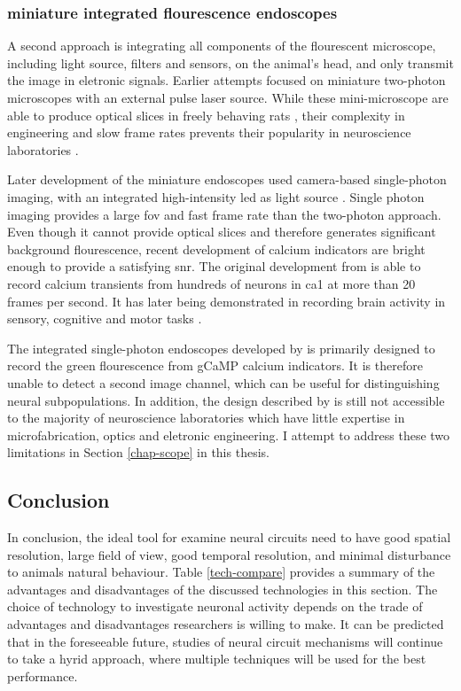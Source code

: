 \subsubsection{miniature integrated flourescence endoscopes}
A second approach is integrating all components of the flourescent microscope, including light source, filters and sensors, on the animal's head, and only transmit the image in eletronic signals. Earlier attempts focused on miniature two-photon microscopes with an external pulse laser source\citep{flusberg05, piyawattanametha09}. While these mini-microscope are able to produce optical slices in freely behaving rats \citep{sawinski09}, their complexity in engineering and slow frame rates prevents their popularity in neuroscience laboratories \citep{hamel15, yang17}.

Later development of the miniature endoscopes used camera-based single-photon imaging, with an integrated high-intensity \gls{led} as light source \citep{ghosh11}. Single photon imaging provides a large \gls{fov} and fast frame rate than the two-photon approach. Even though it cannot provide optical slices and therefore generates significant background flourescence, recent development of calcium indicators are bright enough to provide a satisfying \gls{snr}. The original development from \citet{ghosh11} is able to record calcium transients from hundreds of neurons in \gls{ca1} at more than 20 frames per second. It has later being demonstrated in recording brain activity in sensory, cognitive and motor tasks \citep{ziv13}.

The integrated single-photon endoscopes developed by \citet{ghosh11} is primarily designed to record the green flourescence from gCaMP calcium indicators. It is therefore unable to detect a second image channel, which can be useful for distinguishing neural subpopulations. In addition, the design described by \citet{ghosh11} is still not accessible to the majority of neuroscience laboratories which have little expertise in microfabrication, optics and eletronic engineering. I attempt to address these two limitations in Section \ref{chap-scope} in this thesis. 

\subsection{Conclusion}

In conclusion, the ideal tool for examine neural circuits need to have good spatial resolution, large field of view, good temporal resolution, and minimal disturbance to animals natural behaviour. Table \ref{tech-compare} provides a summary of the advantages and disadvantages of the discussed technologies in this section. The choice of technology to investigate neuronal activity depends on the trade of advantages and disadvantages researchers is willing to make. It can be predicted that in the foreseeable future, studies of neural circuit mechanisms will continue to take a hyrid approach, where multiple techniques will be used for the best performance. 

